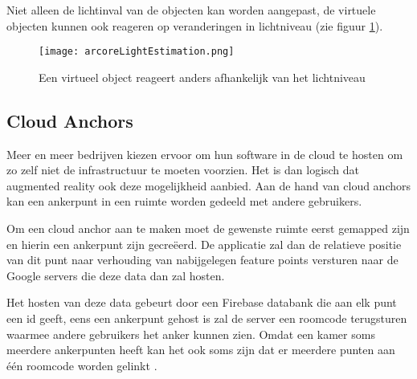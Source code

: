 Niet alleen de lichtinval van de objecten kan worden aangepast, de virtuele objecten kunnen ook reageren op veranderingen in lichtniveau (zie figuur \ref{fig:arcoreLightEstimation}).

\begin{figure}
    \texttt{[image: arcoreLightEstimation.png]}
    \caption{Een virtueel object reageert anders afhankelijk van het lichtniveau \autocite{UnityLight}}
    \label{fig:arcoreLightEstimation}
\end{figure}

\subsection{Cloud Anchors}
Meer en meer bedrijven kiezen ervoor om hun software in de cloud te hosten om zo zelf niet de infrastructuur te moeten voorzien. Het is dan logisch dat augmented reality ook deze mogelijkheid aanbied. Aan de hand van cloud anchors kan een ankerpunt in een ruimte worden gedeeld met andere gebruikers. 

Om een cloud anchor aan te maken moet de gewenste ruimte eerst gemapped zijn en hierin een ankerpunt zijn gecreëerd. De applicatie zal dan de relatieve positie van dit punt naar verhouding van nabijgelegen feature points versturen naar de Google servers die deze data dan zal hosten. 

Het hosten van deze data gebeurt door een Firebase databank die aan elk punt een id geeft, eens een ankerpunt gehost is zal de server een roomcode terugsturen waarmee andere gebruikers het anker kunnen zien. Omdat een kamer soms meerdere ankerpunten heeft kan het ook soms zijn dat er meerdere punten aan één roomcode worden gelinkt \autocite{ARCoreCloudAnchors}.

